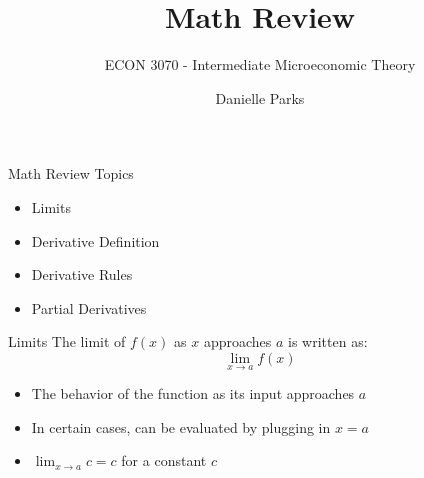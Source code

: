 \documentclass[aspectratio=169]{beamer}
\author{Danielle Parks}
\title{Math Review}
\subtitle{ECON 3070 - Intermediate Microeconomic Theory}
\begin{document}
\begin{frame}
  \titlepage
\end{frame}

\begin{frame}{Math Review Topics}\label{main1}
\begin{itemize}
	\begin{itemize}
		\item Limits
		\item Derivative Definition
		\item Derivative Rules
		\item Partial Derivatives
	\end{itemize}
\end{itemize}

\end{frame}

\begin{frame}{Limits}\label{main1}
	The limit of \( f(x) \) as \( x \) approaches \( a \) is written as:
\[
\lim_{x \to a} f(x)
\]
\begin{itemize}
\begin{itemize}
	\item The behavior of the function as its input approaches \( a \)
	\item In certain cases, can be evaluated by plugging in \( x = a \)
	\item \( \lim_{x \to a} c = c \) for a constant \( c \)
\end{itemize}
\end{itemize}

\end{frame}
\end{document}

